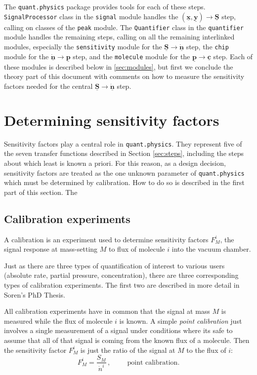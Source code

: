 \documentclass{article}
\newcommand{\code}[1]{\colorbox{codegray}{\lstinline{#1}}}
\renewcommand{\vec}[1]{\underline{\mathbf{#1}}}
\begin{document}
The \code{quant.physics} package provides tools for each of these steps. \code{SignalProcessor} class in the \code{signal} module handles the $(\vec{x}, \vec{y})\rightarrow \vec{S}$ step, calling on classes of the \code{peak} module. The \code{Quantifier} class in the \code{quantifier} module handles the remaining steps, calling on all the remaining interlinked modules, especially the \code{sensitivity} module for the $\vec{S} \rightarrow \vec{\dot{n}}$ step, the \code{chip} module for the $\vec{\dot{n}} \rightarrow \vec{p}$ step, and the \code{molecule} module for the $\vec{p}\rightarrow\vec{c}$ step. Each of these modules is described below in \ref{sec:modules}, but first we conclude the theory part of this document with comments on how to measure the sensitivity factors needed for the central $\vec{S} \rightarrow \vec{\dot{n}}$ step.



\section{Determining sensitivity factors}\label{sec:calibration}

Sensitivity factors play a central role in \code{quant.physics}. They represent five of the seven transfer functions described in Section \ref{sec:steps}, including the steps about which least is known a priori. For this reason, as a design decision, sensitivity factors are treated as the one unknown parameter of \code{quant.physics} which must be determined by calibration. How to do so is described in the first part of this section. The 

\subsection{Calibration experiments}

A calibration is an experiment used to determine sensitivity factors $F^i_M$, the signal response at mass-setting $M$ to flux of molecule $i$ into the vacuum chamber. 

Just as there are three types of quantification of interest to various users (absolute rate, partial pressure, concentration), there are three corresponding types of calibration experiments. The first two are described in more detail in Soren's PhD Thesis.

All calibration experiments have in common that the signal at mass $M$ is measured while the flux of molecule $i$ is known. A simple \textit{point calibration} just involves a single measurement of a signal under conditions where its safe to assume that all of that signal is coming from the known flux of a molecule. Then the sensitivity factor $F_M^i$ is just the ratio of the signal at $M$ to the flux of $i$:
\begin{equation}
	F_M^i = \frac{S_M}{\dot{n}^i}\,, \hspace{1cm} \text{point calibration.} \label{eq:point}
\end{equation}
\end{document}
